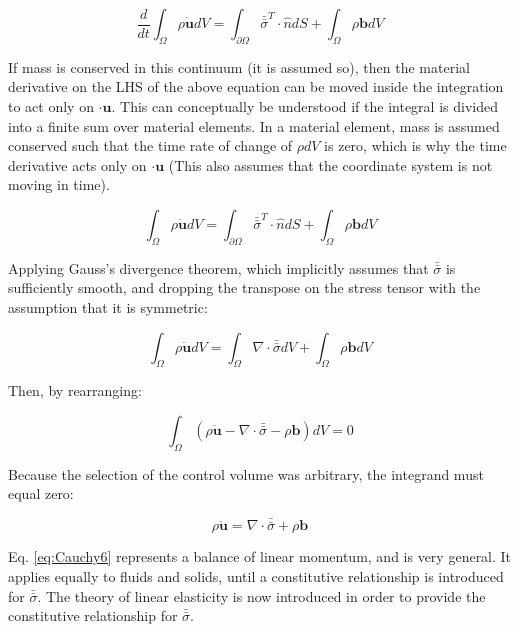 \documentclass[10pt]{article}
\begin{document}
\begin{equation}
\label{eq:Cauchy2}
\frac{d}{dt}\int_{\Omega}\rho\dot{\textbf{u}}dV=\int_{\partial\Omega}\bar{\bar{\sigma}}^T\cdot\hat{n}dS+\int_{\Omega}\rho\textbf{b}dV
\end{equation}

If mass is conserved in this continuum (it is assumed so), then the material derivative on the LHS of the above equation can be moved inside the integration to act only on \(\cdot{\textbf{u}}\). This can conceptually be understood if the integral is divided into a finite sum over material elements. In a material element, mass is assumed conserved such that the time rate of change of \(\rho dV\) is zero, which is why the time derivative acts only on \(\cdot{\textbf{u}}\) (This also assumes that the coordinate system is not moving in time).

\begin{equation}
\label{eq:Cauchy3}
\int_{\Omega}\rho\ddot{\textbf{u}}dV=\int_{\partial\Omega}\bar{\bar{\sigma}}^T\cdot\hat{n}dS+\int_{\Omega}\rho\textbf{b}dV
\end{equation}

Applying Gauss's divergence theorem, which implicitly assumes that \(\bar{\bar{\sigma}}\) is sufficiently smooth, and dropping the transpose on the stress tensor with the assumption that it is symmetric:

\begin{equation}
\label{eq:Cauchy4}
\int_{\Omega}\rho\ddot{\textbf{u}}dV=\int_{\Omega}\nabla\cdot\bar{\bar{\sigma}}dV+\int_{\Omega}\rho\textbf{b}dV
\end{equation}

Then, by rearranging:

\begin{equation}
\label{eq:Cauchy5}
\int_{\Omega}\left(\rho\ddot{\textbf{u}}-\nabla\cdot\bar{\bar{\sigma}}-\rho\textbf{b}\right)dV=0
\end{equation}

Because the selection of the control volume was arbitrary, the integrand must equal zero:

\begin{equation}
\label{eq:Cauchy6}
\rho\ddot{\textbf{u}}=\nabla\cdot\bar{\bar{\sigma}}+\rho\textbf{b}
\end{equation}

Eq. \eqref{eq:Cauchy6} represents a balance of linear momentum, and is very general. It applies equally to fluids and solids, until a constitutive relationship is introduced for \(\bar{\bar{\sigma}}\). The theory of linear elasticity is now introduced in order to provide the constitutive relationship for \(\bar{\bar{\sigma}}\). 
\end{document}
